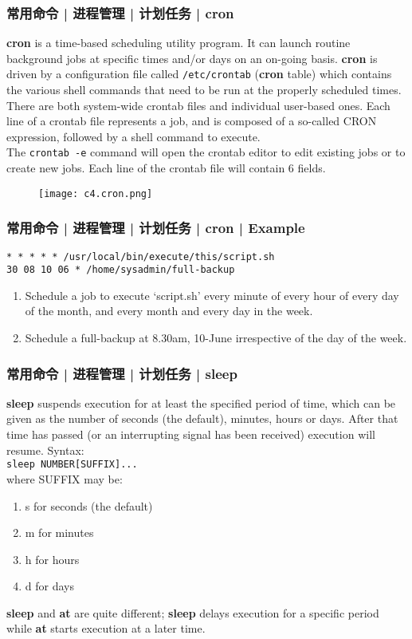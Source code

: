 \begin{frame}[fragile]
  \frametitle{常用命令 | 进程管理 | 计划任务 | cron}
  {\footnotesize
  \textbf{cron} is a time-based scheduling utility program. It can launch routine background jobs at specific times and/or days on an on-going basis.  \textbf{cron} is driven by a configuration file called \verb|/etc/crontab| (\textbf{cron} table) which contains the various shell commands that need to be run at the properly scheduled times. There are both system-wide crontab files and individual user-based ones. Each line of a crontab file represents a job, and is composed of a so-called CRON expression, followed by a shell command to execute.\\
  The \verb|crontab -e| command will open the crontab editor to edit existing jobs or to create new jobs. Each line of the crontab file will contain 6 fields.\\
  }
  \vspace{-0.2cm}
  \begin{figure}
    \centering
    \texttt{[image: c4.cron.png]}
  \end{figure}
\end{frame}

\begin{frame}[fragile]
  \frametitle{常用命令 | 进程管理 | 计划任务 | cron | Example}
\begin{lstlisting}
* * * * * /usr/local/bin/execute/this/script.sh
30 08 10 06 * /home/sysadmin/full-backup
\end{lstlisting}
\pause
\begin{enumerate}
  \item Schedule a job to execute `script.sh' every minute of every hour of every day of the month, and every month and every day in the week.
  \item Schedule a full-backup at 8.30am, 10-June irrespective of the day of the week.
\end{enumerate}
\end{frame}

\begin{frame}[fragile]
  \frametitle{常用命令 | 进程管理 | 计划任务 | sleep}
  \textbf{sleep} suspends execution for at least the specified period of time, which can be given as the number of seconds (the default), minutes, hours or days. After that time has passed (or an interrupting signal has been received) execution will resume. Syntax:\\
  \vspace{0.1cm}
  \verb|sleep NUMBER[SUFFIX]...|\\
  \vspace{0.1cm}
  where SUFFIX may be:
  \begin{enumerate}
    \item s for seconds (the default)
    \item m for minutes
    \item h for hours
    \item d for days
  \end{enumerate}
  \textbf{sleep} and \textbf{at} are quite different; \textbf{sleep} delays execution for a specific period while \textbf{at} starts execution at a later time.
\end{frame}


